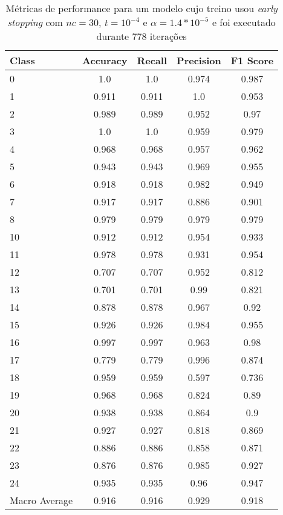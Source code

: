 \begin{table}[!t]
\caption{Métricas de performance para um modelo cujo treino usou \textit{early stopping} com $nc = 30$, $t = 10^{-4}$ e $\alpha = 1.4 * 10^{-5}$ e foi executado durante 778 iterações}
\begin{center}
\begin{tabular}{l c c c c}
Class & Accuracy & Recall & Precision & F1 Score\\ \hline
0 & 1.0 & 1.0 & 0.974 & 0.987\\
1 & 0.911 & 0.911 & 1.0 & 0.953\\
2 & 0.989 & 0.989 & 0.952 & 0.97\\
3 & 1.0 & 1.0 & 0.959 & 0.979\\
4 & 0.968 & 0.968 & 0.957 & 0.962\\
5 & 0.943 & 0.943 & 0.969 & 0.955\\
6 & 0.918 & 0.918 & 0.982 & 0.949\\
7 & 0.917 & 0.917 & 0.886 & 0.901\\
8 & 0.979 & 0.979 & 0.979 & 0.979\\
10 & 0.912 & 0.912 & 0.954 & 0.933\\
11 & 0.978 & 0.978 & 0.931 & 0.954\\
12 & 0.707 & 0.707 & 0.952 & 0.812\\
13 & 0.701 & 0.701 & 0.99 & 0.821\\
14 & 0.878 & 0.878 & 0.967 & 0.92\\
15 & 0.926 & 0.926 & 0.984 & 0.955\\
16 & 0.997 & 0.997 & 0.963 & 0.98\\
17 & 0.779 & 0.779 & 0.996 & 0.874\\
18 & 0.959 & 0.959 & 0.597 & 0.736\\
19 & 0.968 & 0.968 & 0.824 & 0.89\\
20 & 0.938 & 0.938 & 0.864 & 0.9\\
21 & 0.927 & 0.927 & 0.818 & 0.869\\
22 & 0.886 & 0.886 & 0.858 & 0.871\\
23 & 0.876 & 0.876 & 0.985 & 0.927\\
24 & 0.935 & 0.935 & 0.96 & 0.947\\
\hline
Macro Average & 0.916 & 0.916 & 0.929 & 0.918\\
\end{tabular}
\label{tab: nn_early_stopping}
\end{center}
\end{table}

